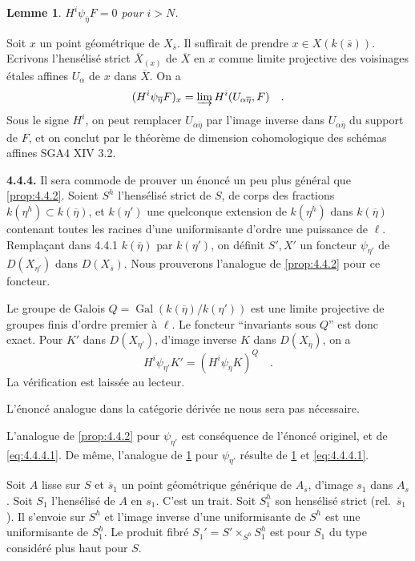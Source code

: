 \documentclass[12pt,a4paper]{article}
\theoremstyle{plain}
\newtheorem{lemma}[theorem]{Lemme}
\theoremstyle{definition}
\DeclareMathOperator{\Gal}{Gal}
\providecommand{\Gal}{\operatorname{Gal}}
\begin{document}
\begin{lemma}\label{lem:4.4.3}
$H^{i}\psi_{\overline{\eta}}F = 0$ pour $i > N$.
\end{lemma}

Soit $x$ un point g\'{e}om\'{e}trique de $X_{\overline{s}}$. Il suffirait de prendre $x \in X(k(\overline{s}))$. Ecrivons l'hens\'{e}lis\'{e} strict $\overline{X}_{(x)}$ de $\overline{X}$ en $x$ comme limite projective des voisinages \'{e}tales affines $U_{\alpha}$ de $x$ dans $\overline{X}$. On a
\[
(H^{i}\psi_{\overline{\eta}}F)_{x} = \varinjlim H^{i}(U_{\alpha\overline{\eta}}, F)\quad.
\]
Sous le signe $H^{i}$, on peut remplacer $U_{\alpha\overline{\eta}}$ par l'image inverse dans $U_{\alpha\overline{\eta}}$ du support de $F$, et on conclut par le th\'{e}or\`{e}me de dimension cohomologique des sch\'{e}mas affines SGA4 XIV 3.2.

\noindent\textbf{4.4.4.} Il sera commode de prouver un \'{e}nonc\'{e} un peu plus g\'{e}n\'{e}ral que \ref{prop:4.4.2}. Soient $S^{h}$ l'hens\'{e}lis\'{e} strict de $S$, de corps des fractions $k(\eta^{h}) \subset k(\overline{\eta})$, et $k(\eta')$ une quelconque extension de $k(\eta^{h})$ dans $k(\overline{\eta})$ contenant toutes les racines d'une uniformisante d'ordre une puissance de $\ell$. Rempla\c{c}ant dans 4.4.1 $k(\overline{\eta})$ par $k(\eta')$, on d\'{e}finit $S', X'$ un foncteur $\psi_{\eta'}$ de $D(X_{\eta'})$ dans $D(X_{\overline{s}})$. Nous prouverons l'analogue de \ref{prop:4.4.2} pour ce foncteur.

Le groupe de Galois $Q = \Gal(k(\overline{\eta})/k(\eta'))$ est une limite projective de groupes finis d'ordre premier \`{a} $\ell$. Le foncteur ``invariants sous $Q$'' est donc exact. Pour $K'$ dans $D(X_{\eta'})$, d'image inverse $K$ dans $D(X_{\overline{\eta}})$, on a
\begin{equation}\label{eq:4.4.4.1}
H^{i}\psi_{\eta'}K' = (H^{i}\psi_{\overline{\eta}}K)^{Q}\quad.
\end{equation}
La v\'{e}rification est laiss\'{e}e au lecteur.

L'\'{e}nonc\'{e} analogue dans la cat\'{e}gorie d\'{e}riv\'{e}e ne nous sera pas n\'{e}cessaire.

L'analogue de \ref{prop:4.4.2} pour $\psi_{\eta'}$ est cons\'{e}quence de l'\'{e}nonc\'{e} originel, et de \eqref{eq:4.4.4.1}. De m\^{e}me, l'analogue de \ref{lem:4.4.3} pour $\psi_{\eta'}$ r\'{e}sulte de \ref{lem:4.4.3} et \eqref{eq:4.4.4.1}.

Soit $A$ lisse sur $S$ et $\overline{s}_{1}$ un point g\'{e}om\'{e}trique g\'{e}n\'{e}rique de $A_{\overline{s}}$, d'image $s_{1}$ dans $A_{s}$. Soit $S_{1}$ l'hens\'{e}lis\'{e} de $A$ en $s_{1}$. C'est un trait. Soit $S_{1}^{h}$ son hens\'{e}lis\'{e} strict (rel.\ $\overline{s}_{1}$). Il s'envoie sur $S^{h}$ et l'image inverse d'une uniformisante de $S^{h}$ est une uniformisante de $S_{1}^{h}$. Le produit fibr\'{e} $S_{1}' = S' \times_{S^{h}} S_{1}^{h}$ est pour $S_{1}$ du type consid\'{e}r\'{e} plus haut pour $S$.
\end{document}
